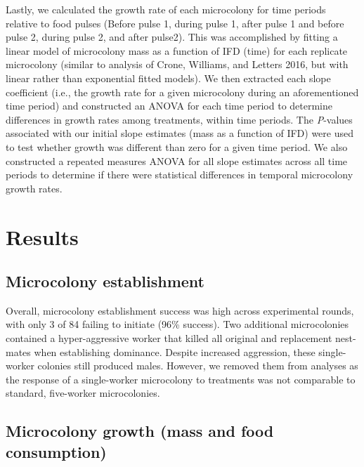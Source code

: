 \documentclass[11pt,]{article}
\begin{document}
Lastly, we calculated the growth rate of each microcolony for time
periods relative to food pulses (Before pulse 1, during pulse 1, after
pulse 1 and before pulse 2, during pulse 2, and after pulse2). This was
accomplished by fitting a linear model of microcolony mass as a function
of IFD (time) for each replicate microcolony (similar to analysis of
Crone, Williams, and Letters 2016, but with linear rather than
exponential fitted models). We then extracted each slope coefficient
(i.e., the growth rate for a given microcolony during an aforementioned
time period) and constructed an ANOVA for each time period to determine
differences in growth rates among treatments, within time periods. The
\emph{P}-values associated with our initial slope estimates (mass as a
function of IFD) were used to test whether growth was different than
zero for a given time period. We also constructed a repeated measures
ANOVA for all slope estimates across all time periods to determine if
there were statistical differences in temporal microcolony growth rates.

\hypertarget{results}{%
\section{Results}\label{results}}

\hypertarget{microcolony-establishment}{%
\subsection{Microcolony establishment}\label{microcolony-establishment}}

Overall, microcolony establishment success was high across experimental
rounds, with only 3 of 84 failing to initiate (96\% success). Two
additional microcolonies contained a hyper-aggressive worker that killed
all original and replacement nest-mates when establishing dominance.
Despite increased aggression, these single-worker colonies still
produced males. However, we removed them from analyses as the response
of a single-worker microcolony to treatments was not comparable to
standard, five-worker microcolonies.

\hypertarget{microcolony-growth-mass-and-food-consumption}{%
\subsection{Microcolony growth (mass and food
consumption)}\label{microcolony-growth-mass-and-food-consumption}}
\end{document}
